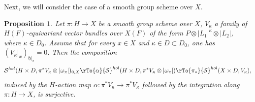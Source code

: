 \documentclass[12pt,reqno]{amsart}
\newtheorem{prop}[theorem]{Proposition}
\theoremstyle{definition}
\theoremstyle{remark}
\numberwithin{equation}{section}
\newcommand{\ot}{\otimes}
\renewcommand{\SS}{{\mathcal S}}
\newcommand{\sub}{\subset}
\newcommand{\om}{\omega}
\renewcommand{\a}{\alpha}
\newcommand{\fh}{{\mathfrak h}}
\begin{document}

Next, we will consider the case of a smooth group scheme over $X$.

\begin{prop}\label{H-equiv-prop}
Let $\pi:H\to X$ be a smooth group scheme over $X$, $V_{\kappa}$ a family of $H(F)$-equivariant vector bundles over $X(F)$ of the form $P\ot |L_1|^{\kappa}\ot |L_2|$, where
$\kappa\in D_0$.
Assume that for every $x\in X$ and $\kappa\in D\sub D_0$, one has $(V_{\kappa}|_x)_{\fh|_x}=0$. Then the composition
$$\SS^{hol}(H\times D,\pi^*V_{\kappa}\ot |\om_\pi|)_{0,X}\rTo{\a}\SS^{hol}(H\times D,\pi^*V_{\kappa}\ot |\om_\pi|)\rTo{\pi_*}\SS^{hol}(X\times D,V_{\kappa}),$$
induced by the $H$-action map $\a:\pi^*V_{\kappa}\to \pi^*V_{\kappa}$ followed by the integration along $\pi:H\to X$,
is surjective.
\end{prop}
\end{document}
